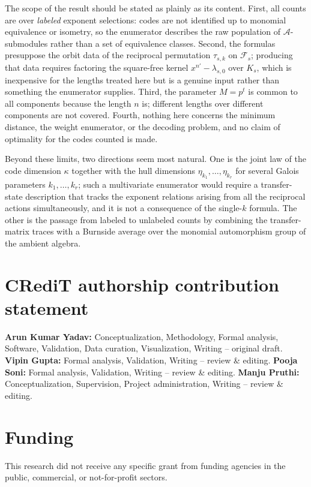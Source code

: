 \documentclass[11pt,a4paper]{article}
\newcommand{\A}{\mathcal A}
\newcommand{\Fs}{\mathcal F_s}
\numberwithin{equation}{section}
\theoremstyle{plain}
\theoremstyle{definition}
\theoremstyle{remark}
\begin{document}
The scope of the result should be stated as plainly as its content. First, all
counts are over \emph{labeled} exponent selections: codes are not identified up
to monomial equivalence or isometry, so the enumerator describes the raw
population of $\A$-submodules rather than a set of equivalence classes.
Second, the formulas presuppose the orbit data of the reciprocal permutation
$\tau_{s,k}$ on $\Fs$; producing that data requires factoring the square-free
kernel $x^{n'}-\lambda_{s,0}$ over $K_s$, which is inexpensive for the lengths
treated here but is a genuine input rather than something the enumerator
supplies. Third, the parameter $M=p^t$ is common to all components because the
length $n$ is; different lengths over different components are not covered.
Fourth, nothing here concerns the minimum distance, the weight enumerator, or
the decoding problem, and no claim of optimality for the codes counted is made.

Beyond these limits, two directions seem most natural. One is the joint law of
the code dimension $\kappa$ together with the hull dimensions
$\eta_{k_1},\ldots,\eta_{k_r}$ for several Galois parameters
$k_1,\ldots,k_r$; such a multivariate enumerator would require a transfer-state
description that tracks the exponent relations arising from all the reciprocal
actions simultaneously, and it is not a consequence of the single-$k$ formula.
The other is the passage from labeled to unlabeled counts by combining the
transfer-matrix traces with a Burnside average over the monomial automorphism
group of the ambient algebra.

\section*{CRediT authorship contribution statement}
\textbf{Arun Kumar Yadav:} Conceptualization, Methodology, Formal analysis,
Software, Validation, Data curation, Visualization, Writing -- original draft.
\textbf{Vipin Gupta:} Formal analysis, Validation, Writing -- review \& editing.
\textbf{Pooja Soni:} Formal analysis, Validation, Writing -- review \& editing.
\textbf{Manju Pruthi:} Conceptualization, Supervision, Project administration,
Writing -- review \& editing.

\section*{Funding}
This research did not receive any specific grant from funding agencies in the
public, commercial, or not-for-profit sectors.
\end{document}
